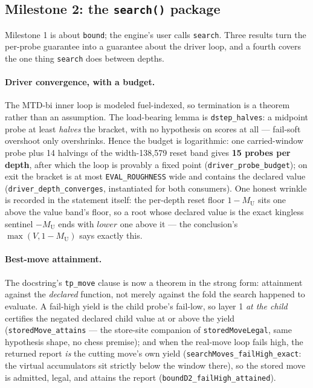 \documentclass[11pt]{article}
\newcommand{\MU}{M_{\mathrm{U}}}    %
\theoremstyle{plain}
\theoremstyle{definition}
\theoremstyle{remark}
\begin{document}
\subsection{Milestone 2: the \texttt{search()} package}
\label{sec:livenessdriver}

Milestone 1 is about \texttt{bound}; the engine's user calls
\texttt{search}.  Three results turn the per-probe guarantee into a
guarantee about the driver loop, and a fourth covers the one thing
\texttt{search} does between depths.

\paragraph{Driver convergence, with a budget.}
The MTD-bi inner loop is modeled fuel-indexed, so termination is a
theorem rather than an assumption.  The load-bearing lemma is
\texttt{dstep\_halves}: a midpoint probe at least \emph{halves} the
bracket, with no hypothesis on scores at all --- fail-soft overshoot
only overshrinks.  Hence the budget is logarithmic:
one carried-window probe plus 14 halvings of the width-138{,}579 reset
band gives \textbf{15 probes per depth}, after which the loop is
provably a fixed point (\texttt{driver\_probe\_budget}); on exit the
bracket is at most \texttt{EVAL\_ROUGHNESS} wide and contains the
declared value (\texttt{driver\_depth\_converges}, instantiated for
both consumers).  One honest wrinkle is recorded in the statement
itself: the per-depth reset floor $1 - \MU$ sits one above the value
band's floor, so a root whose declared value is the exact kingless
sentinel $-\MU$ ends with $\mathit{lower}$ one above it --- the
conclusion's $\max(V, 1-\MU)$ says exactly this.

\paragraph{Best-move attainment.}
The docstring's \texttt{tp\_move} clause is now a theorem in the
strong form: attainment against the \emph{declared} function, not
merely against the fold the search happened to evaluate.  A fail-high
yield is the child probe's fail-low, so layer 1 \emph{at the child}
certifies the negated declared child value at or above the yield
(\texttt{storedMove\_attains} --- the store-site companion of
\texttt{storedMoveLegal}, same hypothesis shape, no chess premise);
and when the real-move loop fails high, the returned report \emph{is}
the cutting move's own yield
(\texttt{searchMoves\_failHigh\_exact}: the virtual accumulators sit
strictly below the window there), so the stored move is admitted,
legal, and attains the report
(\texttt{boundD2\_failHigh\_attained}).
\end{document}
